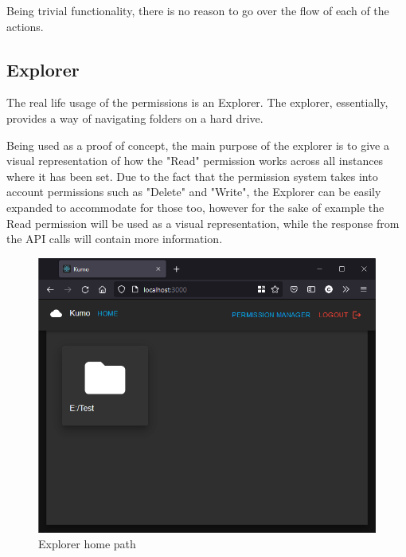 Being trivial functionality, there is no reason to go over the flow of each of the actions.
\subsection{Explorer}
The real life usage of the permissions is an Explorer. The explorer, essentially, provides a way of navigating folders on a hard drive.

Being used as a proof of concept, the main purpose of the explorer is to give a visual representation of how the "Read" permission works across all instances where it has been set. Due to the fact that the permission system takes into account permissions such as "Delete" and "Write", the Explorer can be easily expanded to accommodate for those too, however for the sake of example the Read permission will be used as a visual representation, while the response from the API calls will contain more information.

\begin{figure}[htbp]
	\centering
		\includegraphics[scale=0.65]{./figures/chapter4/explorer_home.png}
	\caption{Explorer home path}
	\label{FigExplorerHome}
\end{figure}

